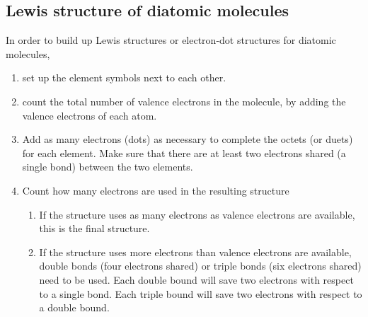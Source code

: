 \documentclass[main.tex]{subfiles}
\begin{document}
\subsection*{Lewis structure of diatomic molecules}
In order to build up Lewis structures or electron-dot structures for diatomic molecules, 
\begin{enumerate} 
\item set up the element symbols next to each other. 
\item count the total number of valence electrons in the molecule, by adding the valence electrons of each atom. 
\item Add as many electrons (dots) as necessary to complete the octets (or duets) for each element. Make sure that there are at least two electrons shared (a single bond) between the two elements. 
\item Count how many electrons are used in the resulting structure
\begin{enumerate}
\item If the structure uses as many electrons as valence electrons are available, this is the final structure.
\item If the structure uses more electrons than valence electrons are available, double bonds (four electrons shared) or triple bonds (six electrons shared) need to be used. Each double bound will save two electrons with respect to a single bond. Each triple bound will save two electrons with respect to a double bound.
 \end{enumerate}
 \end{enumerate}
 
\end{document}
